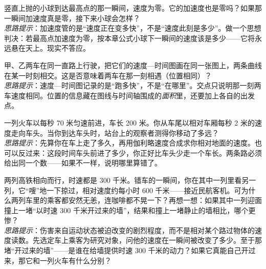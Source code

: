 \begin{puzzles}
\item 竖直上抛的小球到达最高点的那一瞬间，速度为零。它的加速度也是零吗？如果那一瞬间加速度真是零，接下来小球会怎样？\\
\emph{思路提示}：加速度管的是“速度正在变多快”，不是“速度此刻是多少”。做一个思想判决：若最高点加速度为零，按本章公式小球下一瞬间的速度该是多少——它将永远悬在天上。现实不答应。
\item 甲、乙两车在同一直路上行驶，把它们的速度—时间图画在同一张图上，两条曲线在某一时刻相交。这是否意味着两车在那一刻相遇（位置相同）？\\
\emph{思路提示}：速度—时间图记录的是“跑多快”，不是“在哪里”。交点只说明那一刻两车速度相同。位置的信息藏在图线与时间轴围成的\emph{面积}里，还要加上各自的出发点。
\item 一列火车以每秒 70 米匀速前进，车长 200 米。你从车尾以相对车厢每秒 2 米的速度走向车头。当你到达车头时，站台上的观察者测得你移动了多远？\\
\emph{思路提示}：先算你在车上走了多久，再用伽利略速度合成求你相对地面的速度。也可以反过来：这段时间车头前进了多少，你正好比车头少走一个车长。两条路必须给出同一个数——如果不一样，说明哪里算错了。
\item 两列高铁相向而行，时速都是 300 千米。错车的一瞬间，你在其中一列里看另一列，它“嗖”地一下掠过，相对速度约每小时 600 千米——接近民航客机。可为什么两列车里的乘客都安然无恙，连咖啡都不晃一下？再想一想：如果其中一列迎面撞上一堵“以时速 300 千米开过来的墙”，结果和撞上一堵静止的墙相比，哪个更惨？\\
\emph{思路提示}：伤害来自运动状态被迫改变的剧烈程度，而不是相对某个路过物体的速度读数。先选定车上乘客为研究对象，问他的速度在一瞬间被改变了多少。至于那堵“开过来的墙”——是谁在给墙提供时速 300 千米的动力？如果它真能自己开过来，那它和一列火车有什么分别？
\end{puzzles}
